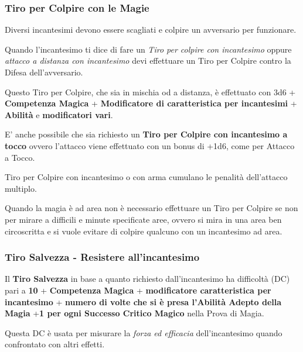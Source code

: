 \begin{multicols}{2}
\subsubsection{Tiro per Colpire con le Magie}\label{magietiropercolpireconlemagie}\hypertarget{magietiropercolpireconlemagie}{}

Diversi incantesimi devono essere scagliati e colpire un avversario per funzionare.

Quando l'incantesimo ti dice di fare un \emph{Tiro per colpire con incantesimo} oppure \emph{attacco a distanza con incantesimo} devi effettuare un Tiro per Colpire contro la Difesa dell'avversario.

Questo Tiro per Colpire, che sia in mischia od a distanza, è effettuato con 3d6 + \textbf{Competenza Magica} + \textbf{Modificatore di caratteristica per incantesimi} + \textbf{Abilità} e \textbf{modificatori vari}.

E' anche possibile che sia richiesto un \textbf{Tiro per Colpire con incantesimo a tocco} ovvero l'attacco viene effettuato con un bonus di +1d6, come per Attacco a Tocco.

Tiro per Colpire con incantesimo o con arma cumulano le penalità dell'attacco multiplo.

\medskip

Quando la magia è ad area non è necessario effettuare un Tiro per Colpire se non per mirare a difficili e minute specificate aree, ovvero si mira in una area ben circoscritta e si vuole evitare di colpire qualcuno con un incantesimo ad area.

\subsubsection{Tiro Salvezza - Resistere all'incantesimo}\label{magietirosalvezza}\hypertarget{magietirosalvezza}{}

Il \textbf{Tiro Salvezza} in base a quanto richiesto dall'incantesimo ha difficoltà (DC) pari a \textbf{10} + \textbf{Competenza Magica} + \textbf{modificatore caratteristica per incantesimo} + \textbf{numero di volte che si è presa l'Abilità Adepto della Magia} +\textbf{1 per ogni Successo Critico Magico} nella Prova di Magia.

Questa DC è usata per misurare la \emph{forza ed efficacia} dell'incantesimo quando confrontato con altri effetti.


\end{multicols}

